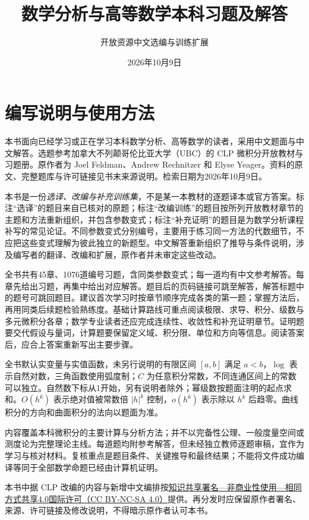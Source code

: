 \documentclass[UTF8,12pt,a4paper,fontset=fandol]{ctexart}
\title{数学分析与高等数学本科习题及解答}
\author{开放资源中文选编与训练扩展}
\date{2026年10月9日}
\begin{document}
\maketitle
\section*{编写说明与使用方法}
本书面向已经学习或正在学习本科数学分析、高等数学的读者，采用中文题面与中文解答。选题参考加拿大不列颠哥伦比亚大学（UBC）的 CLP 微积分开放教材与习题册。原作者为 Joel Feldman、Andrew Rechnitzer 和 Elyse Yeager。资料的原文、完整题库与许可链接见书末来源说明。检索日期为2026年10月9日。

本书是一份\emph{选译、改编与补充训练集}，不是某一本教材的逐题译本或官方答案。标注“选译”的题目来自已核对的原题；标注“改编训练”的题目按所列开放教材章节的主题和方法重新组织，并包含参数变式；标注“补充证明”的题目是为数学分析课程补写的常见论证。不同参数变式分别编号，主要用于练习同一方法的代数细节，不应把这些变式理解为彼此独立的新题型。中文解答重新组织了推导与条件说明，涉及编写者的翻译、改编和扩展，原作者并未审定这些改动。

全书共有45章、1076道编号习题，含同类参数变式；每一道均有中文参考解答。每章先给出习题，再集中给出对应解答。题目后的页码链接可跳至解答，解答标题中的题号可跳回题目。建议首次学习时按章节顺序完成各类的第一题；掌握方法后，再用同类后续题检验熟练度。基础计算路线可重点阅读极限、求导、积分、级数与多元微积分各章；数学专业读者还应完成连续性、收敛性和补充证明章节。证明题要交代假设与量词，计算题要保留定义域、积分限、单位和方向等信息。阅读答案后，应合上答案重新写出主要步骤。

全书默认实变量与实值函数，未另行说明的有限区间 $[a,b]$ 满足 $a<b$，$\log$ 表示自然对数，三角函数使用弧度制；$C$ 为任意积分常数，不同连通区间上的常数可以独立。自然数下标从1开始，另有说明者除外；幂级数按题面注明的起点求和。$O(h^k)$ 表示绝对值被常数倍 $|h|^k$ 控制，$o(h^k)$ 表示除以 $h^k$ 后趋零。曲线积分的方向和曲面积分的法向以题面为准。

内容覆盖本科微积分的主要计算与分析方法；并不以完备性公理、一般度量空间或测度论为完整理论主线。每道题均附参考解答，但未经独立教师逐题审稿，宜作为学习与核对材料。复核重点是题目条件、关键推导和最终结果；不能将文件成功编译等同于全部数学命题已经由计算机证明。

本书中据 CLP 改编的内容与新增中文编排按\href{https://creativecommons.org/licenses/by-nc-sa/4.0/}{知识共享署名—非商业性使用—相同方式共享4.0国际许可（CC BY-NC-SA 4.0）}提供。再分发时应保留原作者署名、来源、许可链接及修改说明，不得暗示原作者认可本书。
\tableofcontents
\clearpage
\end{document}

